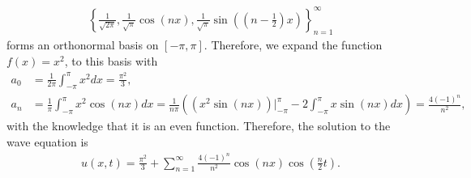 \documentclass[12pt, a4paper]{article}
\begin{document}
\begin{spacing}{1.1}
\begin{align*}
\left\{\frac{1}{\sqrt{2\pi}}, \frac{1}{\sqrt{\pi}}\cos(nx), \frac{1}{\sqrt{\pi}}\sin\left(\left(n - \frac{1}{2} \right)x \right) \right\}_{n=1}^{\infty}
\end{align*}
forms an orthonormal basis on $[-\pi, \pi]$. Therefore, we expand the function $f(x) = x^2$, to this basis with
\begin{align*}
a_0 & = \frac{1}{2\pi} \int_{-\pi}^{\pi} x^2dx = \frac{\pi^2}{3}, \\
a_n & = \frac{1}{\pi}\int_{-\pi}^{\pi} x^2\cos(nx)dx = \frac{1}{n\pi}\left(\left(x^2\sin(nx) \right)\big|_{-\pi}^{\pi} - 2\int_{-\pi}^{\pi} x\sin(nx)dx\right) = \frac{4(-1)^n}{n^2},
\end{align*}
with the knowledge that it is an even function. Therefore, the solution to the wave equation is 
\begin{align*}
u(x, t) = \frac{\pi^2}{3} + \sum_{n=1}^{\infty} \frac{4(-1)^n}{n^2} \cos(nx) \cos\left(\frac{n}{2}t \right).
\end{align*}





  
\end{spacing}
\end{document}
